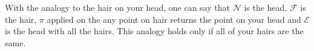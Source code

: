 With the analogy to the hair on your head, one can say that $\mathcal N$ is the head, $\mathcal F$ is the hair, $\pi$ applied on the any point on hair returns the point on your head and $\mathcal E$ is the head with all the hairs. This analogy holds only if all of your hairs are the same.










